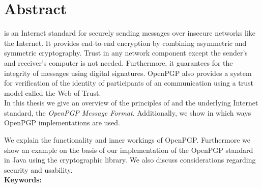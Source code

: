 

\chapter*{Abstract}
\label{cha:abstract}


 is an Internet standard for securely sending messages over insecure networks like the Internet. It provides end-to-end encryption by combining asymmetric and symmetric cryptography. Trust in any network component except the sender's and receiver's computer is not needed. Furthermore, it guarantees for the integrity of messages using digital signatures. OpenPGP also provides a system for verification of the identity of participants of an communication using a trust model called the Web of Trust. \\


In this thesis we give an overview of the principles of  and the underlying Internet standard, the \textit{OpenPGP Message Format}. 
Additionally, we show in which ways OpenPGP implementations are used.

We explain the functionality and inner workings of OpenPGP. Furthermore we show an example on the basis of our implementation of the OpenPGP standard in Java using the  cryptographic library.
We also discuss considerations regarding security and usability.
\\



\textbf{Keywords:} \mykeywords

